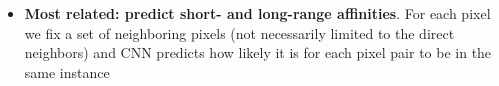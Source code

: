 \begin{itemize}
\begin{itemize}

\item \textbf{Most related: predict short- and long-range affinities}. For each pixel we fix a set of neighboring pixels (not necessarily limited to the direct neighbors) and CNN predicts how likely it is for each pixel pair to be in the same instance \cite{liu2018affinity,wolf2018mutex,lee2017superhuman,xie2015holistically,Maire_2016_CVPR} 

\end{itemize}




\end{itemize}

